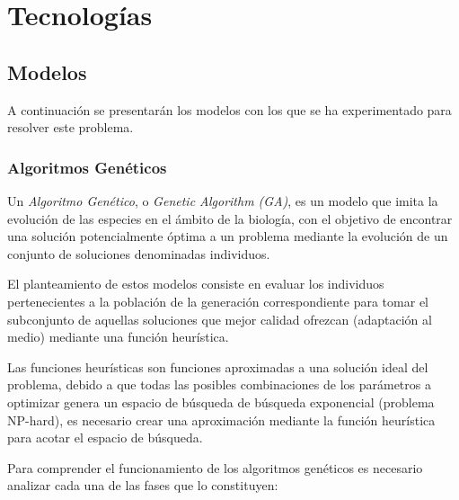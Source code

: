 
\chapter{Tecnologías}
\label{tecnologias}

    \section{Modelos}

        A continuación se presentarán los modelos con los que se ha experimentado para resolver este problema. 

        \subsection {Algoritmos Genéticos}
            Un \textit{Algoritmo Genético}, o \textit{Genetic Algorithm (GA)}, es un modelo que imita la evolución de las especies en el ámbito de la biología, con el objetivo de encontrar una solución potencialmente óptima a un problema mediante la evolución de un conjunto de soluciones denominadas individuos.

            El planteamiento de estos modelos consiste en evaluar los individuos pertenecientes a la población de la generación correspondiente para tomar el subconjunto de aquellas soluciones que mejor calidad ofrezcan (adaptación al medio) mediante una función heurística.

            Las funciones heurísticas son funciones aproximadas a una solución ideal del problema, debido a que todas las posibles combinaciones de los parámetros a optimizar genera un espacio de búsqueda de búsqueda exponencial (problema NP-hard), es necesario crear una aproximación mediante la función heurística para acotar el espacio de búsqueda.

            Para comprender el funcionamiento de los algoritmos genéticos es necesario analizar cada una de las fases que lo constituyen:
            
